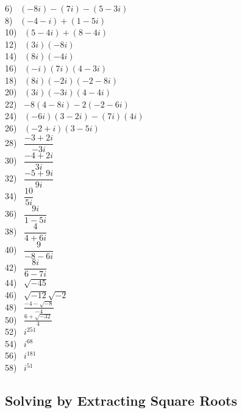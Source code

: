 \begin{multicols}{2}
  6)~ $(- 8 i) - (7 i) - (5 - 3 i)$\\
  8)~ $(- 4 - i) + (1 - 5 i)$\\
  10)~ $(5 - 4 i) + (8 - 4 i)$\\
  12)~ $(3 i) (- 8 i)$\\
  14)~ $(8 i) (- 4 i)$\\
  16)~ $(- i) (7 i) (4 - 3 i)$\\
  18)~ $(8 i) (- 2 i) (- 2 - 8 i)$\\
  20)~ $(3 i) (- 3 i) (4 - 4 i)$\\
  22)~ $- 8 (4 - 8 i) - 2 (- 2 - 6 i)$\\
  24)~ $(- 6 i) (3 - 2 i) - (7 i) (4 i)$\\
  26)~ $(- 2 + i) (3 - 5 i)$\\
  28)~ $\dfrac{- 3 + 2 i}{- 3 i}$\\
  30)~ $\dfrac{- 4 + 2 i}{3 i}$\\
  32)~ $\dfrac{- 5 + 9 i}{9 i}$\\
  34)~ $\dfrac{10}{5 i}$\\
  36)~ $\dfrac{9 i}{1 - 5 i}$\\
  38)~ $\dfrac{4}{4 + 6 i}$\\
  40)~ $\dfrac{9}{- 8 - 6 i}$\\
  42)~ $\dfrac{8 i}{6 - 7 i}$\\
  44)~ $\sqrt{- 45}$\\
  46)~ $\sqrt{- 12} \sqrt{- 2}$\\
  48)~ $\frac{- 4 - \sqrt{- 8}}{- 4}$\\
  50)~ $\frac{6 + \sqrt{- 32}}{4}$\\
  52)~ $i^{251}$\\
  54)~ $i^{68}$\\
  56)~ $i^{181}$\\
  58)~ $i^{51}$
\end{multicols}

\newpage

\subsection{Solving by Extracting Square Roots}

{}

